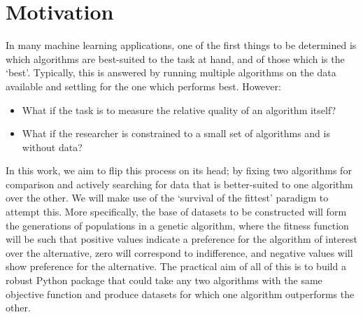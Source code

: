 \section{Motivation}\label{sec:motivation}

In many machine learning applications, one of the first things to be determined
is which algorithms are best-suited to the task at hand, and of those which is
the `best'. Typically, this is answered by running  multiple algorithms on the
data available and settling for the one which performs best. However:

\begin{itemize}
    \item[] What if the task is to measure the relative quality of an algorithm
        itself?

    \item[] What if the researcher is constrained to a small set of algorithms
        and is without data?
\end{itemize}

In this work, we aim to flip this process on its head; by fixing two algorithms
for comparison and actively searching for data that is better-suited to one
algorithm over the other. We will make use of the `survival of the fittest'
paradigm to attempt this. More specifically, the base of datasets to be
constructed will form the generations of populations in a genetic algorithm,
where the fitness function will be such that positive values indicate a
preference for the algorithm of interest over the alternative, zero will
correspond to indifference, and negative values will show preference for the
alternative. The practical aim of all of this is to build a robust Python
package that could take any two algorithms with the same objective function and
produce datasets for which one algorithm outperforms the other.
